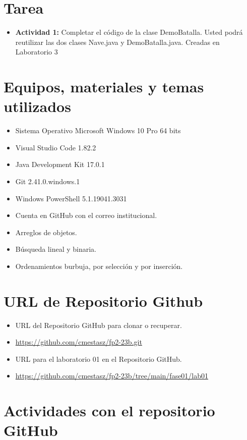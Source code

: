 \documentclass{article}
\begin{document}
\section{Tarea}
\begin{itemize}
	\item \textbf{Actividad 1:} Completar el código de la clase DemoBatalla. Usted podrá reutilizar las dos clases Nave.java y DemoBatalla.java. Creadas en Laboratorio 3
\end{itemize}
\pagebreak

\section{Equipos, materiales y temas utilizados}
\begin{itemize}
	\item Sistema Operativo Microsoft Windows 10 Pro 64 bits
	\item Visual Studio Code 1.82.2
	\item Java Development Kit 17.0.1
	\item Git 2.41.0.windows.1
	\item Windows PowerShell 5.1.19041.3031
	\item Cuenta en GitHub con el correo institucional.
	\item Arreglos de objetos.
	\item Búsqueda lineal y binaria.
	\item Ordenamientos burbuja, por selección y por inserción.
\end{itemize}

\section{URL de Repositorio Github}
\begin{itemize}
	\item URL del Repositorio GitHub para clonar o recuperar.
	\item \url{https://github.com/cmestasz/fp2-23b.git}
	\item URL para el laboratorio 01 en el Repositorio GitHub.
	\item \url{https://github.com/cmestasz/fp2-23b/tree/main/fase01/lab01}
\end{itemize}

\section{Actividades con el repositorio GitHub}
\end{document}
